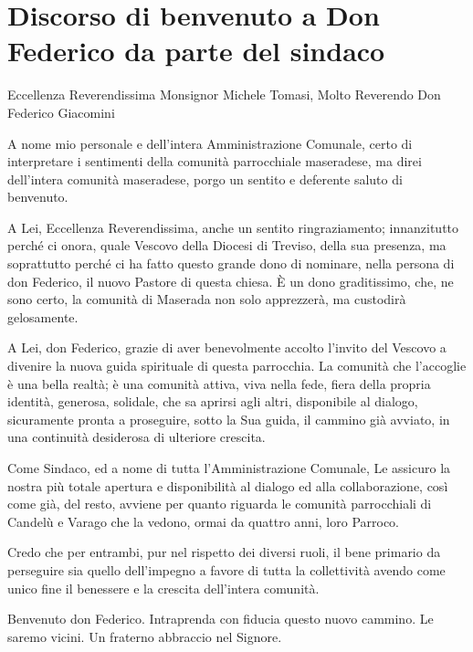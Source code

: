 \section{Discorso di benvenuto a Don Federico da parte del sindaco}


Eccellenza Reverendissima Monsignor Michele Tomasi, Molto Reverendo Don Federico Giacomini

A nome mio personale e dell'intera Amministrazione Comunale, certo di interpretare i sentimenti della comunità parrocchiale maseradese, ma direi dell'intera comunità maseradese, porgo un sentito e deferente saluto di benvenuto.

A Lei, Eccellenza Reverendissima, anche un sentito ringraziamento; innanzitutto perché ci onora, quale Vescovo della Diocesi di Treviso, della sua presenza, ma soprattutto perché ci ha fatto questo grande dono di nominare, nella persona di don Federico, il nuovo Pastore di questa chiesa. È un dono graditissimo, che, ne sono certo, la comunità di Maserada non solo apprezzerà, ma custodirà gelosamente.

A Lei, don Federico, grazie di aver benevolmente accolto l'invito del Vescovo a divenire la nuova guida spirituale di questa parrocchia. La comunità che l'accoglie è una bella realtà; è una comunità attiva, viva nella fede, fiera della propria identità, generosa, solidale, che sa aprirsi agli altri, disponibile al dialogo, sicuramente pronta a proseguire, sotto la Sua guida, il cammino già avviato, in una continuità desiderosa di ulteriore crescita.

Come Sindaco, ed a nome di tutta l'Amministrazione Comunale, Le assicuro la nostra più totale apertura e disponibilità al dialogo ed alla collaborazione, così come già, del resto, avviene per quanto riguarda le comunità parrocchiali di Candelù e Varago che la vedono, ormai da quattro anni, loro Parroco.

Credo che per entrambi, pur nel rispetto dei diversi ruoli, il bene primario da perseguire sia quello dell'impegno a favore di tutta la collettività avendo come unico fine il benessere e la crescita dell'intera comunità.

Benvenuto don Federico. Intraprenda con fiducia questo nuovo cammino. Le saremo vicini. Un fraterno abbraccio nel Signore.

